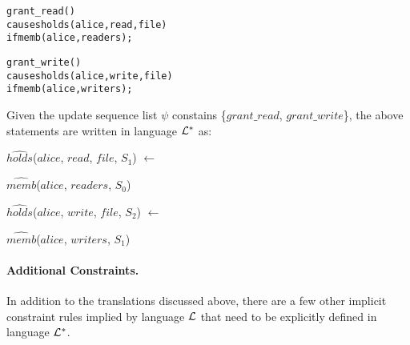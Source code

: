 \documentclass[global,twocolumn,final]{svjour}
\newenvironment{vquote}
  {\begin{list}{}{\leftmargin 1em}\item[]}
  {\end{list}}
\newenvironment{vverbatim}
  {\begin{alltt}}
  {\vspace{-\baselineskip}\end{alltt}}
\begin{document}
          \begin{vverbatim}
  grant\_read()
    causes holds(alice, read, file)
    if memb(alice, readers);

  grant\_write()
    causes holds(alice, write, file)
    if memb(alice, writers);
          \end{vverbatim}

          Given the update sequence list $\psi$ constains
          \{$grant\_read$, $grant\_write$\}, the above statements are written
          in language ${\cal L}^{*}$ as:

          \begin{vquote}
            $\hat{holds}$($alice$, $read$, $file$, $S_{1}$) $\leftarrow$

            \hspace{1em}
            $\hat{memb}$($alice$, $readers$, $S_{0}$)

            $\hat{holds}$($alice$, $write$, $file$, $S_{2}$) $\leftarrow$

            \hspace{1em}
            $\hat{memb}$($alice$, $writers$, $S_{1}$)
          \end{vquote}

        \paragraph{Additional Constraints.}

          In addition to the translations discussed above, there are a few
          other implicit constraint rules implied by language ${\cal L}$
          that need to be explicitly defined in language ${\cal L}^{*}$.
\end{document}
